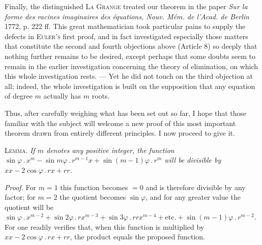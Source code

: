 Finally, the distinguished \textsc{La Grange} treated our theorem in the paper \textit{Sur la forme des racines imaginaires des équations, Nouv. Mém. de l'Acad. de Berlin} 1772, p. 222 ff. This great mathematician took particular pains to supply the defects in \textsc{Euler's} first proof, and in fact investigated especially those matters that constitute the second and fourth objections above (Article 8) so deeply that nothing further remains to be desired, except perhaps that some doubts seem to remain in the earlier investigation concerning the theory of elimination, on which this whole investigation rests. --- Yet he did not touch on the third objection at all; indeed, the whole investigation is built on the supposition that any equation of degree $m$ actually has $m$ roots.

Thus, after carefully weighing what has been set out so far, I hope that those familiar with the subject will welcome a new proof of this most important theorem drawn from entirely different principles. I now proceed to give it.

\textsc{Lemma.} \textit{If $m$ denotes any positive integer, the function $\sin\varphi\mathbin{.}x^m-\sin m\varphi\mathbin{.}r^{m-1}x+\sin(m-1)\varphi\mathbin{.}r^m$ will be divisible by $xx-2\cos\varphi\mathbin{.}rx+rr$.}

\textit{Proof.} For $m=1$ this function becomes $=0$ and is therefore divisible by any factor; for $m=2$ the quotient becomes $\sin\varphi$, and for any greater value the quotient will be $\sin\varphi\mathbin{.}x^{m-2}+\sin2\varphi\mathbin{.}rx^{m-3}+\sin3\varphi\mathbin{.}rrx^{m-4}+\text{etc.}+\sin(m-1)\varphi\mathbin{.}r^{m-2}$. For one readily verifies that, when this function is multiplied by $xx-2\cos\varphi\mathbin{.}rx+rr$, the product equals the proposed function.
